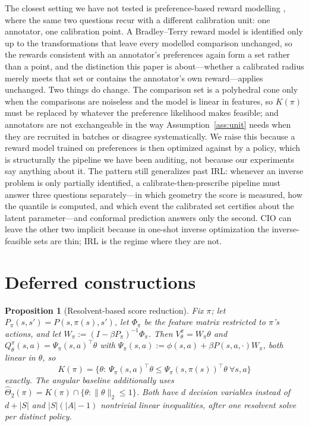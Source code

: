 \documentclass{article}
\newtheorem{proposition}{Proposition}
\begin{document}
The closest setting we have not tested is preference-based reward modelling
\citep{christiano2017deep,rafailov2023direct}, where the same two questions
recur with a different calibration unit: one annotator, one calibration point.
A Bradley--Terry reward model is identified only up to the transformations that
leave every modelled comparison unchanged, so the rewards consistent with an
annotator's preferences again form a set rather than a point, and the
distinction this paper is about---whether a calibrated radius merely meets that
set or contains the annotator's own reward---applies unchanged. Two things do
change. The comparison set is a polyhedral cone only when the comparisons are
noiseless and the model is linear in features, so $K(\pi)$ must be replaced by
whatever the preference likelihood makes feasible; and annotators are not
exchangeable in the way Assumption~\ref{ass:unit} needs when they are recruited
in batches or disagree systematically. We raise this because a reward model
trained on preferences is then optimized against by a policy, which is
structurally the pipeline we have been auditing, not because our experiments
say anything about it. The pattern
still generalizes past IRL: whenever an inverse problem is only partially
identified, a calibrate-then-prescribe pipeline must answer three questions
separately---in which geometry the score is measured, how the quantile is
computed, and which event the calibrated set certifies about the latent
parameter---and conformal prediction answers only the second. CIO can leave the
other two implicit because in one-shot inverse optimization the
inverse-feasible sets are thin; IRL is the regime where they are not.




\appendix

\section{Deferred constructions}
\label{app:angular}

\begin{proposition}[Resolvent-based score reduction]
\label{prop:resolvent}
Fix $\pi$; let $P_\pi(s,s')=P(s,\pi(s),s')$, let $\Phi_\pi$ be the feature
matrix restricted to $\pi$'s actions, and let $W_\pi:=(I-\beta
P_\pi)^{-1}\Phi_\pi$. Then $V^\pi_\theta=W_\pi\theta$ and
$Q^\pi_\theta(s,a)=\Psi_\pi(s,a)^\top\theta$ with
$\Psi_\pi(s,a):=\phi(s,a)+\beta P(s,a,\cdot)W_\pi$, both linear in $\theta$, so
\[
K(\pi)=\{\theta:\
\Psi_\pi(s,a)^\top\theta\le\Psi_\pi(s,\pi(s))^\top\theta\ \forall s,a\}
\]
exactly. The angular baseline additionally uses
$\hat\Theta_2(\pi)=K(\pi)\cap\{\theta:\|\theta\|_2\le1\}$. Both have $d$
decision variables instead of $d+|S|$ and $|S|(|A|-1)$ nontrivial linear
inequalities, after one resolvent solve per distinct policy.
\end{proposition}
\end{document}
